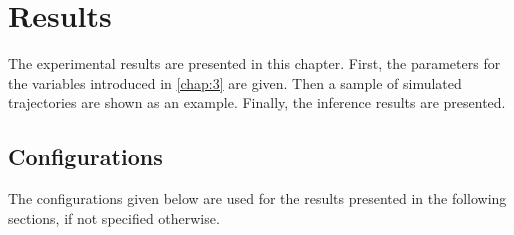 %
%
\renewcommand{\arraystretch}{.9}
\chapter{Results}
\label{chap:4}
The experimental results are presented in this chapter. First, the parameters for the variables introduced in \cref{chap:3} are given. Then a sample of simulated trajectories are shown as an example. Finally, the inference results are presented.

\section{Configurations}
\label{sec:config}
The configurations given below are used for the results presented in the following sections, if not specified otherwise.
